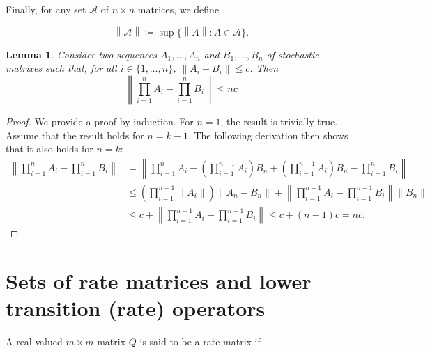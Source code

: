 \documentclass[a4paper,reqno]{amsart}
\newtheorem{lemma}[theorem]{Lemma}
\newcommand{\norm}[1]{\left\lVert #1 \right\rVert}
\begin{document}
\noindent
Finally, for any set $\mathcal{A}$ of $n\times n$ matrices, we define

\begin{equation*}
\norm{\mathcal{A}}\coloneqq\sup\{\norm{A}\colon A\in\mathcal{A}\}.
\end{equation*}

\begin{lemma}\label{lemma:differenceproductoftransition}
Consider two sequences $A_1,\dots,A_n$ and $B_1,\dots,B_n$ of stochastic matrixes such that, for all $i\in\{1,\dots,n\}$, $\norm{A_i-B_i}\leq c$. Then
\begin{equation*}
\norm{\prod_{i=1}^nA_i-\prod_{i=1}^nB_i}\leq nc
\end{equation*}
\end{lemma}
\begin{proof}
We provide a proof by induction. For $n=1$, the result is trivially true. Assume that the result holds for $n=k-1$. The following derivation then shows that it also holds for $n=k$: 
\begin{align*}
\norm{\prod_{i=1}^nA_i-\prod_{i=1}^nB_i}
&=
\norm{\prod_{i=1}^{n}A_i-\left(\prod_{i=1}^{n-1}A_i\right)B_n+\left(\prod_{i=1}^{n-1}A_i\right)B_n-\prod_{i=1}^{n}B_i}\\
&\leq
\left(\prod_{i=1}^{n-1}\norm{A_i}\right)\norm{A_n-B_n}+\norm{\prod_{i=1}^{n-1}A_i-\prod_{i=1}^{n-1}B_i}\norm{B_n}\\
&\leq c + \norm{\prod_{i=1}^{n-1}A_i-\prod_{i=1}^{n-1}B_i}\leq c+(n-1)c= nc.
\end{align*}
\end{proof}




\section{Sets of rate matrices and lower transition (rate) operators}

A real-valued $m\times m$ matrix $Q$ is said to be a rate matrix if
\end{document}
